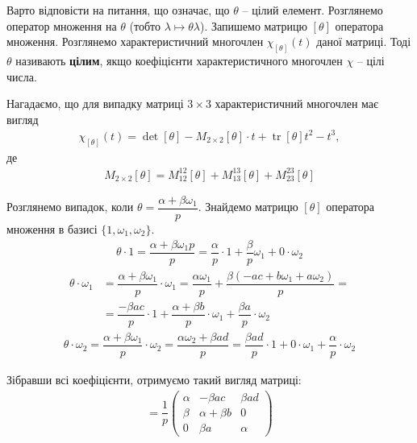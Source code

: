 \documentclass{thesis}
\DeclareMathOperator{\tr}{tr}
\begin{document}
Варто відповісти на питання, що означає, що $\theta$ -- цілий елемент. Розглянемо оператор множення на $\theta$ (тобто $\lambda \mapsto \theta \lambda$). Запишемо матрицю $[\theta]$ оператора множення. Розглянемо характеристичний многочлен $\chi_{[\theta]}(t)$ даної матриці. Тоді $\theta$ називають \textbf{цілим}, якщо коефіцієнти характеристичного многочлен $\chi$ -- цілі числа.

Нагадаємо, що для випадку матриці $3 \times 3$ характеристичний многочлен має вигляд
\begin{align*}
\chi_{[\theta]}(t) = \det [\theta] - M_{2 \times 2}[\theta] \cdot t + \tr [\theta] t^2 - t^3,
\end{align*}
де
\begin{align*}
M_{2 \times 2}[\theta] = M_{12}^{12}[\theta] + M_{13}^{13}[\theta] + M_{23}^{23}[\theta]
\end{align*}

Розглянемо випадок, коли $\theta = \dfrac{\alpha + \beta \omega_1}{p}$. Знайдемо матрицю $[\theta]$ оператора множення в базисі $\{1,\omega_1,\omega_2\}$.
\begin{align*}
\theta \cdot 1 = \dfrac{\alpha + \beta \omega_1 p}{p} = \dfrac{\alpha}{p} \cdot 1 + \dfrac{\beta}{p} \omega_1 + 0 \cdot \omega_2
\end{align*}
\begin{align*}
\theta \cdot \omega_1 & = \dfrac{\alpha + \beta \omega_1}{p} \cdot \omega_1 = \dfrac{\alpha \omega_1}{p} + \dfrac{\beta (-ac + b \omega_1 + a \omega_2)}{p} = \\
& = \dfrac{-\beta a c}{p} \cdot 1 + \dfrac{\alpha + \beta b}{p} \cdot \omega_1 + \dfrac{\beta a}{p} \cdot \omega_2
\end{align*}
\begin{align*}
\theta \cdot \omega_2 = \dfrac{\alpha + \beta \omega_1}{p} \cdot \omega_2 = \dfrac{\alpha \omega_2 + \beta ad}{p} = \dfrac{\beta a d}{p} \cdot 1 + 0 \cdot \omega_1 + \dfrac{\alpha}{p} \cdot \omega_2
\end{align*}

Зібравши всі коефіцієнти, отримуємо такий вигляд матриці:
\begin{align*}
[\theta] = \dfrac{1}{p} \begin{pmatrix}
\alpha & -\beta a c & \beta a d \\
\beta & \alpha + \beta b & 0 \\
0 & \beta a & \alpha
\end{pmatrix}
\end{align*}
\end{document}
